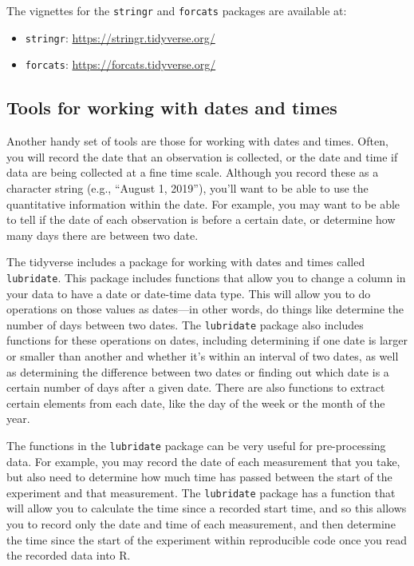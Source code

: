 \documentclass[]{tufte-book}
\providecommand{\tightlist}{%
  \setlength{\itemsep}{0pt}\setlength{\parskip}{0pt}}
\begin{document}
The vignettes for the \texttt{stringr} and \texttt{forcats} packages are available at:

\begin{itemize}
\tightlist
\item
  \texttt{stringr}: \url{https://stringr.tidyverse.org/}
\item
  \texttt{forcats}: \url{https://forcats.tidyverse.org/}
\end{itemize}

\subsection{Tools for working with dates and times}\label{tools-for-working-with-dates-and-times}

Another handy set of tools are those for working with dates and times. Often, you
will record the date that an observation is collected, or the date and time if
data are being collected at a fine time scale. Although you record these as a
character string (e.g., ``August 1, 2019''), you'll want to be able to use the
quantitative information within the date. For example, you may want to be able
to tell if the date of each observation is before a certain date, or determine
how many days there are between two date.

The tidyverse includes a package for working with dates and times called
\texttt{lubridate}. This package includes functions that allow you to change a column
in your data to have a date or date-time data type. This will allow you to
do operations on those values as dates---in other words, do things like determine
the number of days between two dates. The \texttt{lubridate} package also includes
functions for these operations on dates, including determining if one date is
larger or smaller than another and whether it's within an interval of two dates,
as well as determining the difference between two dates or finding out which
date is a certain number of days after a given date. There are also functions
to extract certain elements from each date, like the day of the week or the
month of the year.

The functions in the \texttt{lubridate} package can be very useful for pre-processing
data. For example, you may record the date of each measurement that you take,
but also need to determine how much time has passed between the start of the
experiment and that measurement. The \texttt{lubridate} package has a function that
will allow you to calculate the time since a recorded start time, and so this
allows you to record only the date and time of each measurement, and then
determine the time since the start of the experiment within reproducible code
once you read the recorded data into R.
\end{document}
